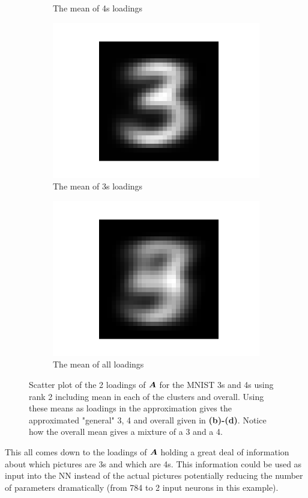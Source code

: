 \begin{figure}
\begin{subfigure}{0.3\linewidth}
        \caption{The mean of 4s loadings}
    \end{subfigure}
    \begin{subfigure}{0.3\linewidth}
    \centering
        \includegraphics[width=.5\linewidth]{Pics/06_results/general3.png}
        \caption{The mean of 3s loadings}
    \end{subfigure}
    \begin{subfigure}{0.3\linewidth}
    \centering
        \includegraphics[width=.5\linewidth]{Pics/06_results/general.png}
        \caption{The mean of all loadings}
        \label{Hej}
    \end{subfigure}
    \caption{Scatter plot of the 2 loadings of $\boldsymbol{A}$ for the MNIST 3s and 4s using rank 2 including mean in each of the clusters and overall. Using these means as loadings in the approximation gives the approximated "general" 3, 4 and overall given in \textbf{(b)-(d)}. Notice how the overall mean gives a mixture of a 3 and a 4.}
    \label{fig:loadingsOfA}
\end{figure}

This all comes down to the loadings of $\boldsymbol{A}$ holding a great deal of information about which pictures are 3s and which are 4s. This information could be used as input into the NN instead of the actual pictures potentially reducing the number of parameters dramatically (from 784 to 2 input neurons in this example). 

